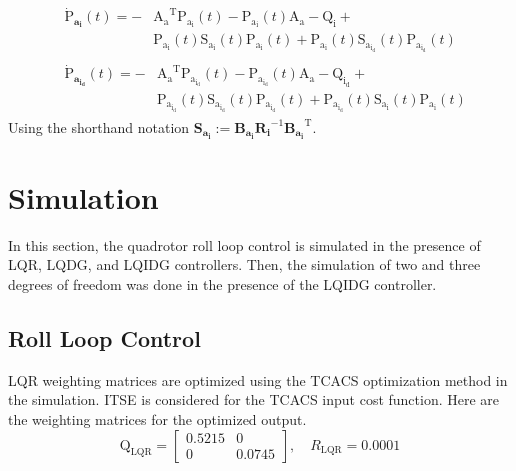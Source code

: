 \documentclass[conference]{IEEEtran}
\begin{document}
\begin{equation}\label{coupled_riccatti_LQIDG}
    \begin{split}
        &\begin{split}
            \boldsymbol{\dot{\mathrm{P}}_{a_i}}(t) = -&\boldsymbol{\mathrm{A_a}}^\mathrm{T}\boldsymbol{\mathrm{P_{a_i}}}(t) - \boldsymbol{\mathrm{P_{a_i}}}(t)\boldsymbol{\mathrm{A_a}} - \boldsymbol{\mathrm{Q_i}} +\\ &\boldsymbol{\mathrm{P_{a_i}}}(t)\boldsymbol{\mathrm{S_{a_i}}}(t)\boldsymbol{\mathrm{P_{a_i}}}(t) + \boldsymbol{\mathrm{P_{a_i}}}(t)\boldsymbol{\mathrm{S_{a_{i_d}}}}(t)\boldsymbol{\mathrm{P_{a_{i_d}}}}(t)
        \end{split}\\
        &\begin{split}
            \boldsymbol{\dot{\mathrm{P}}_{a_{i_d}}}(t) = -&\boldsymbol{\mathrm{A_a}}^\mathrm{T}\boldsymbol{\mathrm{P_{a_{i_d}}}}(t) - \boldsymbol{\mathrm{P_{a_{i_d}}}}(t)\boldsymbol{\mathrm{A_a}} - \boldsymbol{\mathrm{Q_{i_d}}} +\\ &\boldsymbol{\mathrm{P_{a_{i_d}}}}(t)\boldsymbol{\mathrm{S_{a_{i_d}}}}(t)\boldsymbol{\mathrm{P_{a_{i_d}}}}(t) + \boldsymbol{\mathrm{P_{a_{i_d}}}}(t)\boldsymbol{\mathrm{S_{a_i}}}(t)\boldsymbol{\mathrm{P_{a_i}}}(t)
        \end{split}
    \end{split}
\end{equation}
Using the shorthand notation $\boldsymbol{S_{a_i}} := \boldsymbol{B_{a_i}R_{i}}^{-1}\boldsymbol{B_{a_i}}^\mathrm{T}$. %




\section{Simulation}




In this section, the quadrotor roll loop control is simulated in the presence of LQR, LQDG, and LQIDG controllers. Then, the simulation of two and three degrees of freedom was done in the presence of the LQIDG controller.
\subsection{Roll Loop Control}

LQR weighting matrices are optimized using the TCACS optimization method in the simulation.
ITSE is considered for the TCACS input cost function.
Here are the weighting matrices for the optimized output.
\begin{equation}
	\boldsymbol{\mathrm{Q}}_{\text{LQR}} = \begin{bmatrix}
		0.5215 & 0\\
		0 & 0.0745
	\end{bmatrix}, \quad R_{\text{LQR}} =  0.0001
\end{equation} 
\end{document}
